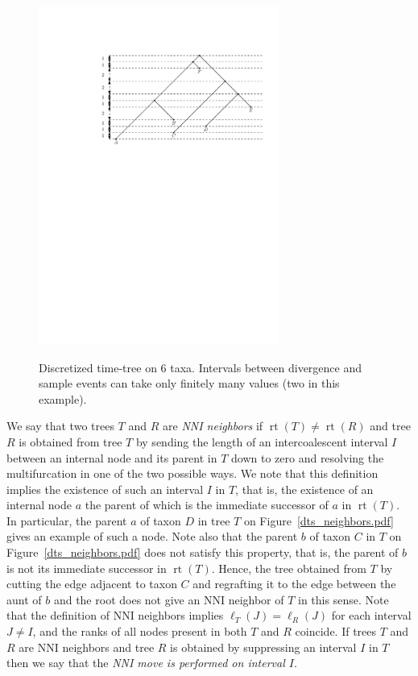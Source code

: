 \documentclass{amsart}
\theoremstyle{definition}
\newcommand{\rt}{\operatorname{rt}}
\begin{document}
\begin{figure}[ht]
\centering
\includegraphics[width=0.7\textwidth]{T5.pdf}
\label{T5.pdf}
\caption{Discretized time-tree on $6$ taxa.
Intervals between divergence and sample events can take only finitely many values (two in this example).}
\end{figure}

We say that two trees $T$ and $R$ are {\em NNI neighbors} if $\rt(T) \ne \rt(R)$ and tree $R$ is obtained from tree $T$ by sending the length of an intercoalescent interval $I$ between an internal node and its parent in $T$ down to zero and resolving the multifurcation in one of the two possible ways.
We note that this definition implies the existence of such an interval $I$ in $T$, that is, the existence of an internal node $a$ the parent of which is the immediate successor of $a$ in $\rt(T)$.
In particular, the parent $a$ of taxon $D$ in tree $T$ on Figure~\ref{dts_neighbors.pdf} gives an example of such a node.
Note also that the parent $b$ of taxon $C$ in $T$ on Figure~\ref{dts_neighbors.pdf} does not satisfy this property, that is, the parent of $b$ is not its immediate successor in $\rt(T)$.
Hence, the tree obtained from $T$ by cutting the edge adjacent to taxon $C$ and regrafting it to the edge between the aunt of $b$ and the root does not give an NNI neighbor of $T$ in this sense.
Note that the definition of NNI neighbors implies $\ell_T(J) = \ell_R(J)$ for each interval $J \ne I$, and the ranks of all nodes present in both $T$ and $R$ coincide.
If trees $T$ and $R$ are NNI neighbors and tree $R$ is obtained by suppressing an interval $I$ in $T$ then we say that the {\em NNI move is performed on interval $I$}.
\end{document}

